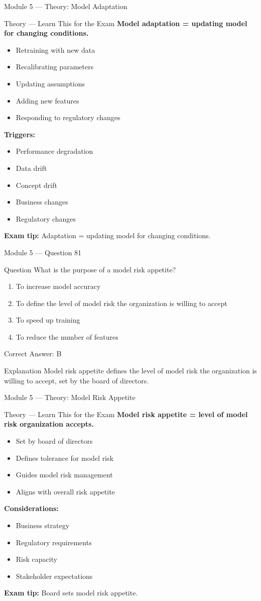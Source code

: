\documentclass[aspectratio=169,10pt]{beamer}
\newcommand{\question}[1]{%
	\begin{block}{Question}
		#1
	\end{block}
}
\newcommand{\options}[4]{%
	\begin{enumerate}[label=\Alph*.,leftmargin=*]
		\item #1
		\item #2
		\item #3
		\item #4
	\end{enumerate}
}
\newcommand{\answerbox}[1]{%
	\begin{exampleblock}{Correct Answer: #1}
	\end{exampleblock}
}
\newcommand{\explain}[1]{%
	\begin{block}{Explanation}
		\small #1
	\end{block}
}
\newcommand{\theory}[1]{%
	\begin{block}{Theory --- Learn This for the Exam}
		\small #1
	\end{block}
}
\begin{document}
	\begin{frame}{Module 5 --- Theory: Model Adaptation}
		\theory{
			\textbf{Model adaptation = updating model for changing conditions.}
			\begin{itemize}
				\item Retraining with new data
				\item Recalibrating parameters
				\item Updating assumptions
				\item Adding new features
				\item Responding to regulatory changes
			\end{itemize}
			\textbf{Triggers:}
			\begin{itemize}
				\item Performance degradation
				\item Data drift
				\item Concept drift
				\item Business changes
				\item Regulatory changes
			\end{itemize}
			\textbf{Exam tip:} Adaptation = updating model for changing conditions.
		}
	\end{frame}
	
	\begin{frame}{Module 5 --- Question 81}
		\question{What is the purpose of a model risk appetite?}
		\options{To increase model accuracy}{To define the level of model risk the organization is willing to accept}{To speed up training}{To reduce the number of features}
		\answerbox{B}
		\explain{Model risk appetite defines the level of model risk the organization is willing to accept, set by the board of directors.}
	\end{frame}
	
	\begin{frame}{Module 5 --- Theory: Model Risk Appetite}
		\theory{
			\textbf{Model risk appetite = level of model risk organization accepts.}
			\begin{itemize}
				\item Set by board of directors
				\item Defines tolerance for model risk
				\item Guides model risk management
				\item Aligns with overall risk appetite
			\end{itemize}
			\textbf{Considerations:}
			\begin{itemize}
				\item Business strategy
				\item Regulatory requirements
				\item Risk capacity
				\item Stakeholder expectations
			\end{itemize}
			\textbf{Exam tip:} Board sets model risk appetite.
		}
	\end{frame}
	
\end{document}
